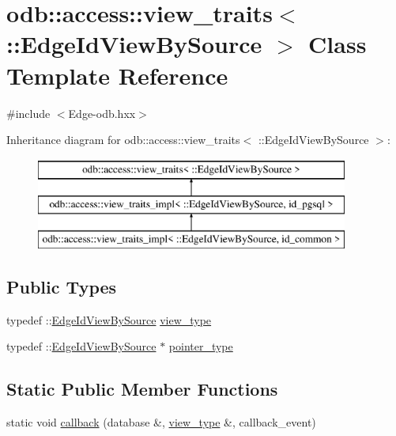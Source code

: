 \hypertarget{classodb_1_1access_1_1view__traits_3_01_1_1_edge_id_view_by_source_01_4}{}\section{odb\+:\+:access\+:\+:view\+\_\+traits$<$ \+:\+:Edge\+Id\+View\+By\+Source $>$ Class Template Reference}
\label{classodb_1_1access_1_1view__traits_3_01_1_1_edge_id_view_by_source_01_4}


{\ttfamily \#include $<$Edge-\/odb.\+hxx$>$}

Inheritance diagram for odb\+:\+:access\+:\+:view\+\_\+traits$<$ \+:\+:Edge\+Id\+View\+By\+Source $>$\+:\begin{figure}[H]
\begin{center}
\leavevmode
\includegraphics[height=3.000000cm]{d7/d17/classodb_1_1access_1_1view__traits_3_01_1_1_edge_id_view_by_source_01_4}
\end{center}
\end{figure}
\subsection*{Public Types}
\begin{DoxyCompactItemize}
\item 
typedef \+::\hyperlink{struct_edge_id_view_by_source}{Edge\+Id\+View\+By\+Source} \hyperlink{classodb_1_1access_1_1view__traits_3_01_1_1_edge_id_view_by_source_01_4_a59c0e6416446c0356c1d4b5be32c1239}{view\+\_\+type}
\item 
typedef \+::\hyperlink{struct_edge_id_view_by_source}{Edge\+Id\+View\+By\+Source} $\ast$ \hyperlink{classodb_1_1access_1_1view__traits_3_01_1_1_edge_id_view_by_source_01_4_ad5f59d6c9ac6e7f0fb09fc12a146dc67}{pointer\+\_\+type}
\end{DoxyCompactItemize}
\subsection*{Static Public Member Functions}
\begin{DoxyCompactItemize}
\item 
static void \hyperlink{classodb_1_1access_1_1view__traits_3_01_1_1_edge_id_view_by_source_01_4_ac509868a17b26d13ea01166ccc265d2a}{callback} (database \&, \hyperlink{classodb_1_1access_1_1view__traits_3_01_1_1_edge_id_view_by_source_01_4_a59c0e6416446c0356c1d4b5be32c1239}{view\+\_\+type} \&, callback\+\_\+event)
\end{DoxyCompactItemize}


